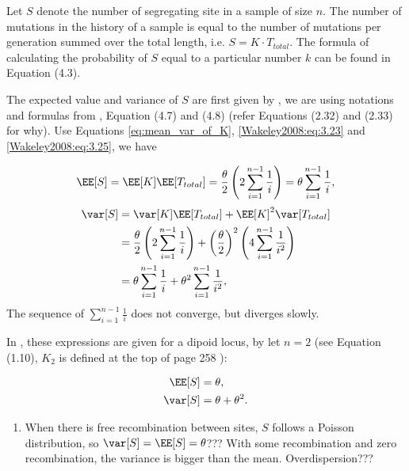 Let $S$ denote the number of segregating site in a sample of size $n$. The number of mutations in the history of a sample is equal to the number of mutations per generation summed over the total length, i.e. $S=K\cdot T_{total}$. The formula of calculating the probability of $S$ equal to a particular number $k$ can be found in \citet{Wakeley2008} Equation (4.3).

The expected value and variance of $S$ are first given by \cite{Watterson1975}, we are using notations and formulas from \citet{Wakeley2008}, Equation (4.7) and (4.8) (refer \citet{Wakeley2008} Equations (2.32) and (2.33) for why). Use Equations \eqref{eq:mean_var_of_K}, \eqref{Wakeley2008:eq:3.23} and \eqref{Wakeley2008:eq:3.25}, we have

\begin{equation}
\EE[S]=\EE[K]\EE[T_{total}]=\frac{\theta}{2}\left(2\sum_{i=1}^{n-1}\frac{1}{i}\right)=\theta\sum_{i=1}^{n-1}\frac{1}{i},\label{wakeley2008:eq:4.7}
\end{equation}
\begin{align}%
\var[S]&=\var[K]\EE[T_{total}]+\EE[K]^2\var[T_{total}]\notag\\
&=\frac{\theta}{2}\left(2\sum_{i=1}^{n-1}\frac{1}{i}\right)+ \left(\frac{\theta}{2}\right)^2\left(4\sum_{i=1}^{n-1}\frac{1}{i^2}\right)\notag \\
&=\theta\sum_{i=1}^{n-1}\frac{1}{i}+\theta^2\sum_{i=1}^{n-1}\frac{1}{i^2},\label{wakeley2008:eq:4.8}
\end{align}
The sequence of $\sum_{i=1}^{n-1}\frac{1}{i}$ does not converge, but diverges slowly.

In \citet{Watterson1975}, these expressions are given for a dipoid locus, by let $n=2$ (see Equation (1.10), $K_2$ is defined at the top of page 258 \citep{Watterson1975}):

\begin{align}
\EE[S]&=\theta,\label{Watterson1975:1.10:exp}\\ 
\var[S]&=\theta+\theta^2.\label{Watterson1975:1.10:var}
\end{align}

{\color{red}{\bf Questions:}
\begin{enumerate}
\item When there is free recombination between sites, $S$ follows a Poisson distribution, so $\var[S]=\EE[S]=\theta$??? With some  recombination and zero recombination, the variance is bigger than the mean. Overdispersion???
\end{enumerate}
} 

